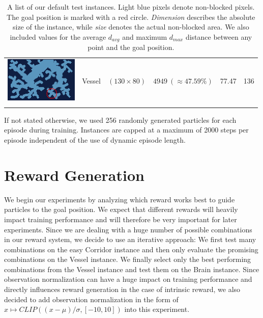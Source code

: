 \begin{table} [h!]
\begin{center}
\begin{tabular}{cccccc}
            \parbox[c]{3.5cm}{\includegraphics[clip, width=3.5cm]{figures/evaluation/procedure/vessel_upscaled.png}} & Vessel & $(130 \times 80)$ & $4949 \ (\approx 47.59\%)$ & 77.47 & 136 \\
            \addlinespace[0.05cm]
            \bottomrule
        \end{tabular}
    \end{center}
    \caption[Test Instances]{A list of our default test instances. Light blue pixels denote non-blocked pixels. The goal position is marked with a red circle. \textit{Dimension} describes the absolute size of the instance, while \textit{size} denotes the actual non-blocked area. We also included values for the average $d_{avg}$ and maximum $d_{max}$ distance between any point and the goal position.} \label{tab:TestInstances}
\end{table}

If not stated otherwise, we used 256 randomly generated particles for each episode during training. Instances are capped at a maximum of 2000 steps per episode independent of the use of dynamic episode length.

\section{Reward Generation} \label{sec:EvalReward}
We begin our experiments by analyzing which reward works best to guide particles to the goal position. We expect that different rewards will heavily impact training performance and will therefore be very important for later experiments. Since we are dealing with a huge number of possible combinations in our reward system, we decide to use an iterative approach: We first test many combinations on the easy Corridor instance and then only evaluate the promising combinations on the Vessel instance. We finally select only the best performing combinations from the Vessel instance and test them on the Brain instance. Since observation normalization can have a huge impact on training performance and directly influences reward generation in the case of intrinsic reward, we also decided to add observation normalization in the form of $x \mapsto CLIP((x - \mu)/\sigma, [-10, 10])$ into this experiment.

